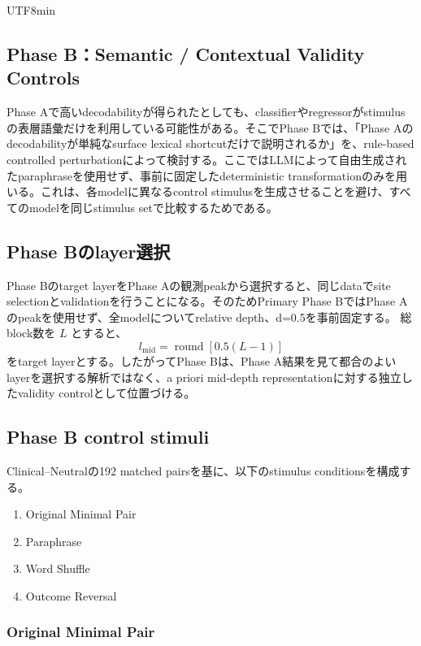 \documentclass{article} %
\begin{document}
\begin{CJK*}{UTF8}{min}
\subsection{Phase B：Semantic / Contextual Validity Controls}
\label{app:v1-phase-b}

Phase Aで高いdecodabilityが得られたとしても、classifierやregressorがstimulusの表層語彙だけを利用している可能性がある。そこでPhase Bでは、「Phase Aのdecodabilityが単純なsurface lexical shortcutだけで説明されるか」を、rule-based controlled perturbationによって検討する。ここではLLMによって自由生成されたparaphraseを使用せず、事前に固定したdeterministic transformationのみを用いる。これは、各modelに異なるcontrol stimulusを生成させることを避け、すべてのmodelを同じstimulus setで比較するためである。


\subsection{Phase Bのlayer選択}

Phase Bのtarget layerをPhase Aの観測peakから選択すると、同じdataでsite selectionとvalidationを行うことになる。そのためPrimary Phase BではPhase Aのpeakを使用せず、全modelについてrelative depth、d=0.5を事前固定する。
総block数を \(L\) とすると、
\[
l_{\mathrm{mid}}
=
\operatorname{round}
\left[
0.5(L-1)
\right]
\]
をtarget layerとする。したがってPhase Bは、Phase A結果を見て都合のよいlayerを選択する解析ではなく、a priori mid-depth representationに対する独立したvalidity controlとして位置づける。

\subsection{Phase B control stimuli}

Clinical--Neutralの192 matched pairsを基に、以下のstimulus conditionsを構成する。
\begin{enumerate}
    \item Original Minimal Pair
    \item Paraphrase
    \item Word Shuffle
    \item Outcome Reversal
\end{enumerate}


\subsubsection{Original Minimal Pair}


\end{CJK*}
\end{document}
